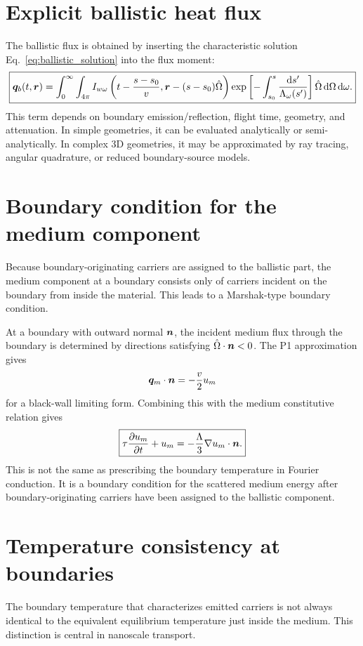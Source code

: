 \documentclass[11pt]{article}
\begin{document}
\section{Explicit ballistic heat flux}
The ballistic flux is obtained by inserting the characteristic solution Eq.~\eqref{eq:ballistic_solution} into the flux moment:
\begin{equation}
    \boxed{\bm{q}_b(t,\bm{r})=\int_0^\infty\int_{4\pi}
    I_{w\omega}\left(t-\frac{s-s_0}{v},\bm{r}-(s-s_0)\hat{\Omega}\right)
    \exp\left[-\int_{s_0}^{s}\frac{\dd s'}{\Lambda_\omega(s')}\right]
    \hat{\Omega}\,\dd\Omega\,\dd\omega.}
    \label{eq:ballistic_flux_general}
\end{equation}
This term depends on boundary emission/reflection, flight time, geometry, and attenuation. In simple geometries, it can be evaluated analytically or semi-analytically. In complex 3D geometries, it may be approximated by ray tracing, angular quadrature, or reduced boundary-source models.

\section{Boundary condition for the medium component}
Because boundary-originating carriers are assigned to the ballistic part, the medium component at a boundary consists only of carriers incident on the boundary from inside the material. This leads to a Marshak-type boundary condition.

At a boundary with outward normal \(\bm{n}\), the incident medium flux through the boundary is determined by directions satisfying \(\hat{\Omega}\cdot\bm{n}<0\). The P1 approximation gives
\begin{equation}
    \bm{q}_m\cdot\bm{n}=-\frac{v}{2}u_m
    \label{eq:marshak_flux_relation}
\end{equation}
for a black-wall limiting form. Combining this with the medium constitutive relation gives
\begin{equation}
    \boxed{\tau\frac{\partial u_m}{\partial t}+u_m
    =-\frac{\Lambda}{3}\nabla u_m\cdot\bm{n}.}
    \label{eq:marshak_um}
\end{equation}
This is not the same as prescribing the boundary temperature in Fourier conduction. It is a boundary condition for the scattered medium energy after boundary-originating carriers have been assigned to the ballistic component.

\section{Temperature consistency at boundaries}
The boundary temperature that characterizes emitted carriers is not always identical to the equivalent equilibrium temperature just inside the medium. This distinction is central in nanoscale transport.
\end{document}
